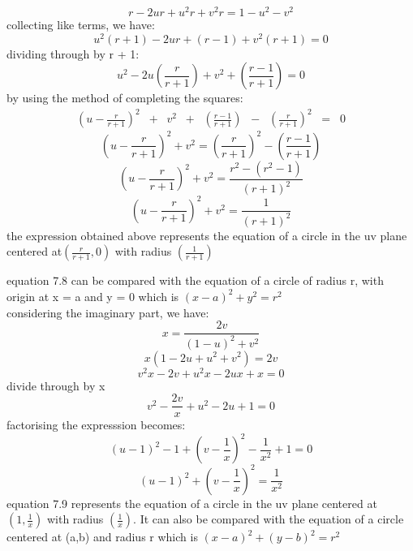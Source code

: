 \begin{equation*}
r - 2ur + u^2r + v^2r = 1 - u^2 - v^2
\end{equation*}
collecting like terms, we have:
\begin{equation*}
u^2(r + 1) -2ur + (r - 1) + v^2(r + 1) = 0
\end{equation*}
dividing through by r + 1:
\begin{equation}
u^2 - 2u(\frac{r}{r + 1}) + v^2 +(\frac{r - 1}{r + 1}) = 0
\end{equation}
by using the method of completing the squares:
\begin{align*}
(u - \frac{r}{r+1})^2\;\;+\;\;v^2\;\;+\;\;(\frac{r-1}{r+1})\;\; - \;\;(\frac{r}{r+1})^2\;\; = \;\;0
\end{align*}
\begin{equation*}
(u - \frac{r}{r + 1})^2 + v^2 =(\frac{r}{r + 1})^2 -(\frac{r - 1}{r + 1}) 
\end{equation*}
\begin{equation*}
(u - \frac{r}{r + 1})^2+ v^2 =\frac{r^2 -(r^2 -1)}{(r + 1)^2}
\end{equation*}
\begin{equation}
(u - \frac{r}{r + 1})^2+ v^2 = \frac{1}{(r + 1)^2}
\end{equation}
the expression obtained above represents the equation of a circle in the uv plane centered at$ (\frac{r}{r + 1}, 0) $ with radius $ (\frac{1}{r + 1}) $

equation 7.8 can be compared  with  the equation of a circle of radius r, with origin at x = a and y = 0 which is $ (x - a)^2 + y^2 = r^2 $\\ 
considering the imaginary part, we have:
\begin{equation*}
x =\frac{2v}{(1 - u)^2 + v^2}
\end{equation*}
\begin{equation*}
x(1 - 2u + u^2 + v^2) = 2v
\end{equation*}
\begin{equation*}
v^2x - 2v + u^2x - 2ux + x = 0
\end{equation*}
divide through by x
\begin{equation*}
v^2 - \frac{2v}{x} +u^2 - 2u + 1 = 0
\end{equation*}
factorising the expresssion becomes:
\begin{equation*}
(u - 1)^2 -1 + (v - \frac{1}{x})^2 -\frac{1}{x^2} + 1 = 0
\end{equation*}
\begin{equation}
(u - 1)^2 + (v - \frac{1}{x})^2 = \frac{1}{x^2}
\end{equation}
equation 7.9 represents the equation of a circle in the uv plane centered at $ (1,\frac{1}{x}) $ with radius $ (\frac{1}{x}) $.
It can also be compared with the equation of a circle centered at (a,b) and radius r which is $ (x - a)^2 + (y-b)^2 = r^2 $

